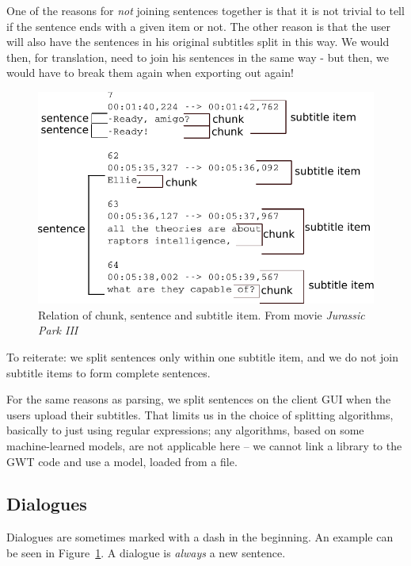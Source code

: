 One of the reasons for \emph{not} joining sentences together is that it is not trivial to tell if the sentence ends with a given item or not. The other reason is that the user will also have the sentences in his original subtitles split in this way. We would then, for translation, need to join his sentences in the same way - but then, we would have to break them again when exporting out again!

\begin{figure}[t]
\begin{center}
\includegraphics{figures/chunks.pdf}
\end{center}
\caption{Relation of chunk, sentence and subtitle item. From movie \emph{Jurassic Park III}}\label{splitting:chunks}
\end{figure}

To reiterate: we split sentences only within one subtitle item, and we do not join subtitle items to form complete sentences.

For the same reasons as parsing, we split sentences on the client GUI when the users upload their subtitles. That limits us in the choice of splitting algorithms, basically to just using regular expressions; any algorithms, based on some machine-learned models, are not applicable here -- we cannot link a library to the GWT code and use a model, loaded from a file.

\subsection*{Dialogues}
Dialogues are sometimes marked with a dash in the beginning. An example can be seen in Figure~\ref{splitting:chunks}. A dialogue is \emph{always} a new sentence.

